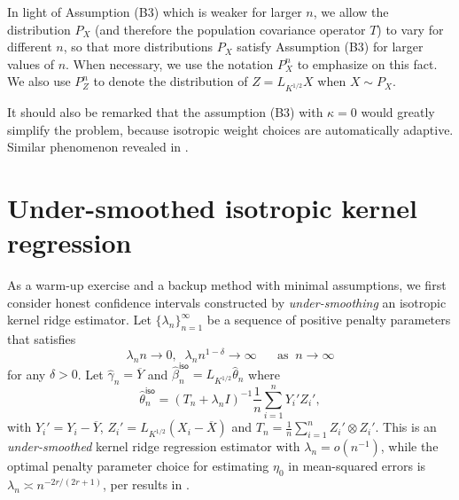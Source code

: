 \documentclass[11pt,a4paper]{article}
\renewcommand{\hat}{\widehat}
\renewcommand{\bar}{\overline}
\theoremstyle{definition}
\theoremstyle{plain}
\theoremstyle{remark}
\newcommand{\iso}{\mathsf{iso}}
\begin{document}
%
%

{\color{blue}In light of Assumption (B3) which is weaker for larger $n$, we allow the distribution $P_X$ (and therefore the population covariance operator $T$) to vary for different $n$,
so that more distributions $P_X$ satisfy Assumption (B3) for larger values of $n$.
When necessary, we use the notation $P_X^n$ to emphasize on this fact.
We also use $P_Z^n$ to denote the distribution of $Z=L_{K^{1/2}}X$ when $X\sim P_X$.}

{\color{red}It should also be remarked that the assumption (B3) with $\kappa=0$ would greatly simplify the problem, because isotropic weight choices are automatically adaptive.
Similar phenomenon revealed in \citep{liu2025scalable}.}

\section{Under-smoothed isotropic kernel regression}\label{sec:isotropic}

As a warm-up exercise and a backup method with minimal assumptions, we first consider honest confidence intervals constructed by \emph{under-smoothing} an isotropic kernel ridge estimator.
Let $\{\lambda_n\}_{n=1}^{\infty}$ be a sequence of positive penalty parameters that satisfies
\begin{equation}
\lambda_n n \to 0,\;\; \lambda_n n^{1-\delta}\to \infty\;\;\;\;\;\;\text{as}\;\;n\to\infty
\label{eq:lambdan-1}
\end{equation}
for any $\delta>0$.
Let $\hat\gamma_n = \bar Y$ and $\hat\beta_n^\iso=L_{K^{1/2}}\hat\theta_n$ where 
$$
\hat\theta_n^\iso = (T_n+\lambda_n I)^{-1}\frac{1}{n}\sum_{i=1}^n Y_i'Z_i',
$$
with $Y_i'=Y_i-\bar Y$, $Z_i'=L_{K^{1/2}}(X_i-\bar X)$ and $T_n=\frac{1}{n}\sum_{i=1}^n Z_i'\otimes Z_i'$.
This is an \emph{under-smoothed} kernel ridge regression estimator with $\lambda_n=o(n^{-1})$, while the optimal penalty parameter choice for estimating $\eta_0$ in mean-squared errors 
is $\lambda_n\asymp n^{-2r/(2r+1)}$, per results in \cite{cai2012minimax}.
\end{document}
